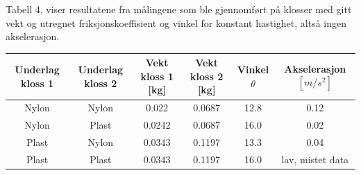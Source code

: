 \documentclass[10pt,a4paper]{report}
\begin{document}
\begin{center}
     \begin{tablenotes}
 	\small
 	\item Tabell 4, viser resultatene fra målingene som ble gjennomført på klosser med gitt vekt og utregnet friksjonskoeffisient og vinkel for konstant hastighet, altså ingen akselerasjon. 
 	\end{tablenotes}
  \begin{tabular}{| c | c | c | c | c  | c |}
    \hline
    Underlag kloss 1 & Underlag kloss 2 & Vekt kloss 1 [kg] & Vekt kloss 2 [kg] & Vinkel $\theta$ & Akselerasjon $[m/s^2]$ \\ \hline
    Nylon & Nylon & 0.022 & 0.0687 & 12.8 & 0.12 \\ \hline
    Nylon & Plast & 0.0242 & 0.0687 & 16.0 & 0.02 \\ \hline
    Plast & Nylon & 0.0343 & 0.1197 & 13.3 & 0.04 \\ \hline
    Plast & Plast & 0.0343 & 0.1197 & 16.0 & lav, mistet data  \\ \hline
  \end{tabular}
\end{center}
\end{document}
